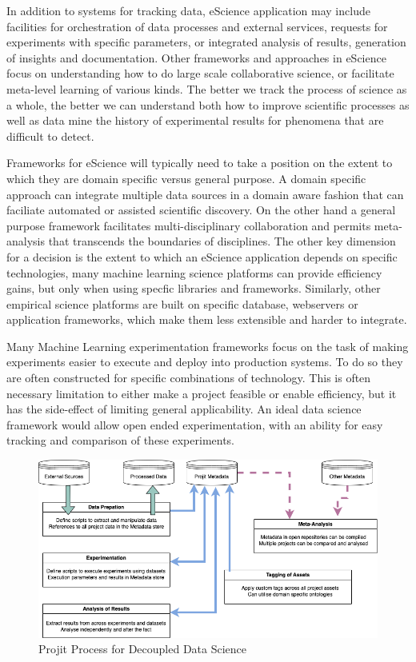 \documentclass[sigconf]{acmart}
\begin{document}
In addition to systems for tracking data, eScience application may include facilities
for orchestration of data processes and external services\cite{Subramanian2013}, 
requests for experiments with specific parameters\cite{Hunter:2005}, 
or integrated analysis of results, generation of insights and documentation. 
Other frameworks and approaches in eScience focus on understanding how to do large 
scale collaborative science, or facilitate meta-level learning of various 
kinds\cite{Hunter:2005,Liu:2023}. The better we track the
process of science as a whole, the better we can understand both how to improve 
scientific processes as well as data mine the history of experimental results for 
phenomena that are difficult to detect.

Frameworks for eScience will typically need to take a position on the extent to which 
they are domain specific versus general purpose. A domain specific approach can 
integrate multiple data sources in a domain aware fashion that can faciliate 
automated or assisted scientific discovery\cite{Howe2008,Pettit:2010}. On the
other hand a general purpose framework facilitates multi-disciplinary collaboration 
and permits meta-analysis that transcends the boundaries of disciplines. 
The other key dimension for a decision is the extent to which an eScience 
application depends on specific technologies, many machine learning science platforms
can provide efficiency gains, but only when using specfic libraries and 
frameworks\cite{Alberti:2018,MolnerDomenech:2020}. Similarly, other empirical 
science platforms are built on specific database, webservers or application
frameworks, which make them less extensible and harder to integrate.

Many Machine Learning experimentation frameworks focus on the task of making experiments
easier to execute and deploy into production systems\cite{Alberti:2018,MolnerDomenech:2020}.
To do so they are often constructed for specific combinations of technology.
This is often necessary limitation to either make a project feasible or enable efficiency,
but it has the side-effect of limiting general applicability. An ideal data science
framework would allow open ended experimentation, with an ability for easy tracking
and comparison of these experiments.

\begin{figure}
\includegraphics[scale=0.6]{./images/Projit_decoupled_process.drawio.png}
\caption{Projit Process for Decoupled Data Science}
\label{fig:projit}
\end{figure}
\end{document}
